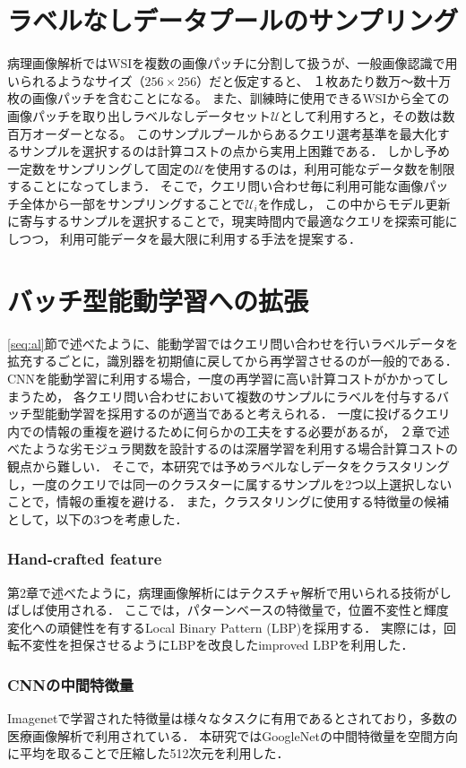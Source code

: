 \section{ラベルなしデータプールのサンプリング}
病理画像解析ではWSIを複数の画像パッチに分割して扱うが、一般画像認識で用いられるようなサイズ（$256 \times 256$）だと仮定すると、
１枚あたり数万〜数十万枚の画像パッチを含むことになる。
また、訓練時に使用できるWSIから全ての画像パッチを取り出しラベルなしデータセット$\mathcal{U}$として利用すろと，その数は数百万オーダーとなる。
このサンプルプールからあるクエリ選考基準を最大化するサンプルを選択するのは計算コストの点から実用上困難である．
しかし予め一定数をサンプリングして固定の$\mathcal{U}$を使用するのは，利用可能なデータ数を制限することになってしまう．
そこで，クエリ問い合わせ毎に利用可能な画像パッチ全体から一部をサンプリングすることで$\mathcal{U}_i$を作成し，
この中からモデル更新に寄与するサンプルを選択することで，現実時間内で最適なクエリを探索可能にしつつ，
利用可能データを最大限に利用する手法を提案する．

\section{バッチ型能動学習への拡張}
\ref{seq:al}節で述べたように、能動学習ではクエリ問い合わせを行いラベルデータを拡充するごとに，識別器を初期値に戻してから再学習させるのが一般的である．
CNNを能動学習に利用する場合，一度の再学習に高い計算コストがかかってしまうため，
各クエリ問い合わせにおいて複数のサンプルにラベルを付与するバッチ型能動学習を採用するのが適当であると考えられる．
一度に投げるクエリ内での情報の重複を避けるために何らかの工夫をする必要があるが，
２章で述べたような劣モジュラ関数を設計するのは深層学習を利用する場合計算コストの観点から難しい．
そこで，本研究では予めラベルなしデータをクラスタリングし，一度のクエリでは同一のクラスターに属するサンプルを2つ以上選択しないことで，情報の重複を避ける．
また，クラスタリングに使用する特徴量の候補として，以下の3つを考慮した．

\subsubsection{Hand-crafted feature}
第2章で述べたように，病理画像解析にはテクスチャ解析で用いられる技術がしばしば使用される．
ここでは，パターンベースの特徴量で，位置不変性と輝度変化への頑健性を有するLocal Binary Pattern (LBP)\cite{ojala2002multiresolution}を採用する．
実際には，回転不変性を担保させるようにLBPを改良したimproved LBPを利用した．

\subsubsection{CNNの中間特徴量}
Imagenetで学習された特徴量は様々なタスクに有用であるとされており，多数の医療画像解析で利用されている．
本研究ではGoogleNet\cite{szegedy2015going}の中間特徴量を空間方向に平均を取ることで圧縮した512次元を利用した．

